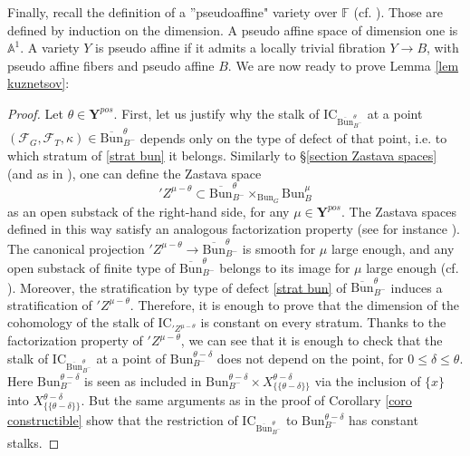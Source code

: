 \documentclass[11pt]{amsart}
\theoremstyle{plain}
\theoremstyle{remark}
\numberwithin{equation}{section}
\begin{document}
Finally, recall the definition of a ''pseudoaffine" variety over $\mathbb{F}$ (cf. \cite[§2.3]{kuznetsov1996laumon}). Those are defined by induction on the dimension. A pseudo affine space of dimension one is $\mathbb{A}^1$. A variety $Y$ is pseudo affine if it admits a locally trivial fibration $Y\to B$, with pseudo affine fibers and pseudo affine $B$. We are now ready to prove Lemma \ref{lem kuznetsov}:
	\begin{proof}
		Let $\theta\in\mathbf{Y}^{pos}$. First, let us justify why the stalk of $\mathrm{IC}_{\overline{\mathrm{Bun}}_{B^-}^\theta}$ at a point $(\mathcal{F}_G,\mathcal{F}_T,\kappa)\in \overline{\mathrm{Bun}}_{B^-}^\theta$ depends only on the type of defect of that point, i.e. to which stratum of \eqref{strat bun} it belongs. Similarly to §\ref{section Zastava spaces} (and as in \cite{BBGM}), one can define the Zastava space
		$${'Z^{\mu-\theta}}\subset \overline{\mathrm{Bun}}_{B^-}^\theta\times_{\mathrm{Bun}_G}\mathrm{Bun}_B^\mu $$
		as an open substack of the right-hand side, for any $\mu\in\mathbf{Y}^{pos}$. The Zastava spaces defined in this way satisfy an analogous factorization property (see for instance \cite[§7]{BBGM}). The canonical projection ${'Z^{\mu-\theta}}\to \overline{\mathrm{Bun}}_{B^-}^\theta$ is smooth for $\mu$ large enough, and any open substack of finite type of $\overline{\mathrm{Bun}}_{B^-}^\theta$ belongs to its image for $\mu$ large enough (cf. {\cite[§3.6]{BBGM}}). Moreover, the stratification by type of defect \eqref{strat bun} of $\overline{\mathrm{Bun}}_{B^-}^\theta$ induces a stratification of 
		${'Z^{\mu-\theta}}$. Therefore, it is enough to prove that the dimension of the cohomology of the stalk of $\mathrm{IC}_{'Z^{\mu-\theta}}$ is constant on every stratum. Thanks to the factorization property of ${'Z^{\mu-\theta}}$, we can see that it is enough to check that the stalk of $\mathrm{IC}_{\overline{\mathrm{Bun}}_{B^-}^\theta}$ at a point of $\mathrm{Bun}_{B^-}^{\theta-\delta}$ does not depend on the point, for $0\leq\delta\leq\theta$. Here $\mathrm{Bun}_{B^-}^{\theta-\delta}$ is seen as included in $\mathrm{Bun}_{B^-}^{\theta-\delta}\times X^{\theta-\delta}_{\{\{\theta-\delta\}\}}$ via the inclusion of $\{x\}$ into $X^{\theta-\delta}_{\{\{\theta-\delta\}\}}$. But the same arguments as in the proof of Corollary \ref{coro constructible} show that the restriction of $\mathrm{IC}_{\overline{\mathrm{Bun}}_{B^-}^\theta}$ to $\mathrm{Bun}_{B^-}^{\theta-\delta}$ has constant stalks.
		

\end{proof}
\end{document}
